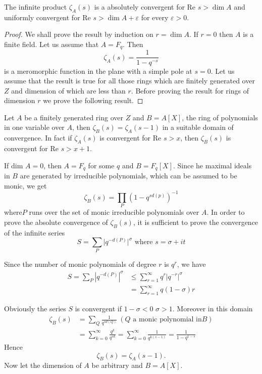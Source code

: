 \begin{proposition}\label{part3:chap2:sec3:prop3}
  The infinite product $\zeta_A(s)$ is a absolutely convergent for
  Re $s  > \dim A$ and uniformly convergent for Re $s > \dim  A+
  \varepsilon$ for every $\varepsilon > 0$. 
\end{proposition} 

\begin{proof}
We shall prove the result by induction on $r= \dim A$. If $r=0$ then
$A$ is a finite field.  Let us assume that $A= F_q$. Then  
$$
\zeta _A (s)= \frac{1}{1-q^{-s}}
$$   
is a meromorphic function in the plane with a simple pole at $s=0$. Let
us assume that the result is true for all those rings which are
finitely generated over $Z$ and dimension of which are less than
$r$. Before proving  the result for rings of dimension  $r$ we prove
the following result. 
\end{proof}

Let $A$ be a finitely generated ring over $Z$ and $B= A [ X ]$, the
ring of polynomials in one variable over $A$, then $\zeta_B(s)=
\zeta_A(s-1)$ in a suitable domain  of convergence.  In fact  if
$\zeta_A(s)$ is convergent for Re $s  > x$, then  $\zeta_B(s)$ is
convergent for Re $s > x+1$.  

If dim  $A= 0$, then  $A=F_q$ for some $q$ and  $B=F_q  [ X ]$. Since
he maximal ideals in $B$ are generated by irreducible polynomials,
which can be assumed to be monic,  we get 
$$
\zeta_B (s)= \prod_P (1-q^{sd(p)})^{-1}
$$  
where\pageoriginale $P$ runs over the set of monic irreducible polynomials over $A$. In
order to prove the absolute convergence of $\zeta_B(s)$, it is
sufficient to prove the convergence of the infinite series 
$$
S= \sum_P \bigg| q^{-d(P)} \bigg|^\sigma \text{ where } s= \sigma + it 
$$

Since the number of monic polynomials of degree $r$ is
$q^r$, we have   
\begin{align*}
  S= \sum_P |q^{-d(P)}|^\sigma & \le \sum^\infty_{r=1} q^r |q^{-r}|^\sigma\\
  &= \sum^\infty_{r=1}q(1-\sigma )r
\end{align*}

Obviously the series $S$ is convergent if $1-\sigma < 0$ \iec  $\sigma
> 1$.  
Moreover in this domain 
\begin{align*}
  \zeta_B(s) &= \sum_Q \frac{1}{q^{sd(Q)}} ~(Q \text{  a monic
    polynomial in} B)\\ 
  &= \sum_{k=0}^\infty \frac{q^k}{q^{sk}}= \sum_{k=0}^{\infty}
  \frac{1}{q^{k(s-1)}} =\frac{1}{1-q^{1-s}} 
\end{align*}
Hence 
$$
\zeta_B(s)= \zeta_A(s-1).
$$
Now let the dimension of $A$ be arbitrary and $B=A[ X ]$.

